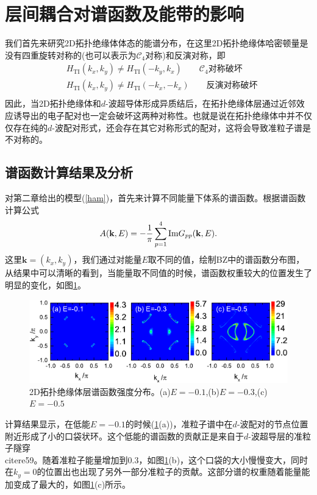 \section{层间耦合对谱函数及能带的影响}
 我们首先来研究2D拓扑绝缘体体态的能谱分布，在这里2D拓扑绝缘体哈密顿量是没有四重旋转对称的(也可以表示为$\mathcal{C}_4$对称)和反演对称，即
\begin{equation}
\begin{aligned}
&H_{\mathrm{TI}}(k_x,k_y)\neq H_\mathrm{TI}(-k_y,k_x)\qquad \textrm{$\mathcal{C}_4$对称破坏}\\
&H_{\mathrm{TI}}(k_x,k_y)\neq H_\mathrm{TI}(-k_x,-k_x)\qquad\textrm{反演对称破坏}\\
\end{aligned}
\end{equation}
因此，当2D拓扑绝缘体和$d$-波超导体形成异质结后，在拓扑绝缘体层通过近邻效应诱导出的电子配对也一定会破坏这两种对称性。也就是说在拓扑绝缘体中并不仅仅存在纯的$d$-波配对形式，还会存在其它对称形式的配对，这将会导致准粒子谱是不对称的。
\subsection{谱函数计算结果及分析}
 对第二章给出的模型(\ref{ham})，首先来计算不同能量下体系的谱函数。根据谱函数计算公式
\begin{equation}
A({\bf k},E)=-\frac{1}{\pi}\sum^4_{p=1}\mathrm{Im} G_{pp}({\bf k},E).
\end{equation}
这里$\mathbf{k}=(k_x,k_y)$，我们通过对能量$E$取不同的值，绘制BZ中的谱函数分布图，从结果中可以清晰的看到，当能量取不同值的时候，谱函数权重较大的位置发生了明显的变化，如图\ref{fig16}。
\begin{figure}[h]
\centering
\includegraphics[scale=0.9]{pic/fig17.pdf}
\caption{2D拓扑绝缘体层谱函数强度分布。(a)$E=-0.1$,(b)$E=-0.3$,(c)$E=-0.5$}\label{fig16}
\end{figure}
计算结果显示，在低能$E=-0.1$的时候(\ref{fig16}(a))，准粒子谱中在$d$-波配对的节点位置附近形成了小的口袋状环。这个低能的谱函数的贡献正是来自于$d$-波超导层的准粒子隧穿\\cite{re59}。随着准粒子能量增加到0.3，如图\ref{fig16}(b)，这个口袋的大小慢慢变大，同时在$k_y=0$的位置出也出现了另外一部分准粒子的贡献。这部分谱的权重随着能量能加变成了最大的，如图\ref{fig16}(c)所示。

